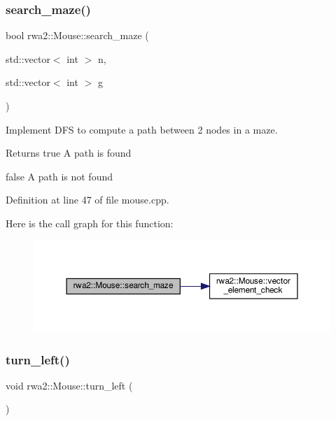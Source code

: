 \subsubsection{\texorpdfstring{search\+\_\+maze()}{search\_maze()}}
{\footnotesize\ttfamily bool rwa2\+::\+Mouse\+::search\+\_\+maze (\begin{DoxyParamCaption}\item[{std\+::vector$<$ int $>$}]{n,  }\item[{std\+::vector$<$ int $>$}]{g }\end{DoxyParamCaption})}



Implement D\+FS to compute a path between 2 nodes in a maze. 

\begin{DoxyReturn}{Returns}
true A path is found 

false A path is not found 
\end{DoxyReturn}


Definition at line 47 of file mouse.\+cpp.

Here is the call graph for this function\+:
\nopagebreak
\begin{figure}[H]
\begin{center}
\leavevmode
\includegraphics[width=350pt]{classrwa2_1_1_mouse_a4b441e30f6c9d446b901f9b21ba104df_cgraph}
\end{center}
\end{figure}
\mbox{\label{classrwa2_1_1_mouse_a5748e94e740432c334d15364fb476919}} 
\subsubsection{\texorpdfstring{turn\+\_\+left()}{turn\_left()}}
{\footnotesize\ttfamily void rwa2\+::\+Mouse\+::turn\+\_\+left (\begin{DoxyParamCaption}{ }\end{DoxyParamCaption})}



